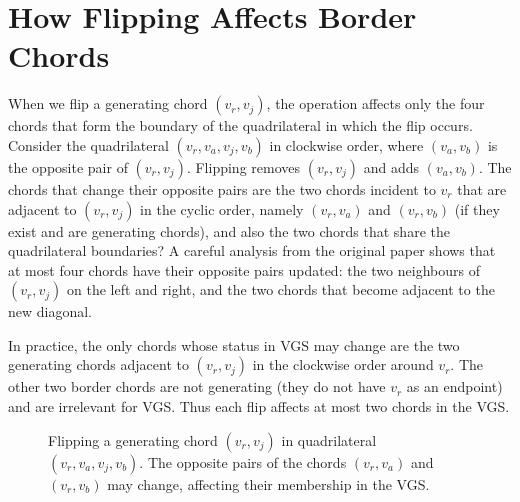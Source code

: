 \section{How Flipping Affects Border Chords}
\label{sec:vgs_flip_effect}

When we flip a generating chord \((v_r, v_j)\), the operation affects only the four chords that form the boundary of the quadrilateral in which the flip occurs. 
Consider the quadrilateral \((v_r, v_a, v_j, v_b)\) in clockwise order, where \((v_a, v_b)\) is the opposite pair of \((v_r, v_j)\). 
Flipping removes \((v_r, v_j)\) and adds \((v_a, v_b)\). 
The chords that change their opposite pairs are the two chords incident to \(v_r\) that are adjacent to \((v_r, v_j)\) in the cyclic order, namely \((v_r, v_a)\) and \((v_r, v_b)\) (if they exist and are generating chords), and also the two chords that share the quadrilateral boundaries? 
A careful analysis from the original paper shows that at most four chords have their opposite pairs updated: the two neighbours of \((v_r, v_j)\) on the left and right, and the two chords that become adjacent to the new diagonal.

In practice, the only chords whose status in VGS may change are the two generating chords adjacent to \((v_r, v_j)\) in the clockwise order around \(v_r\). 
The other two border chords are not generating (they do not have \(v_r\) as an endpoint) and are irrelevant for VGS. 
Thus each flip affects at most two chords in the VGS.

\begin{figure}[htbp]
    \centering
    \caption{Flipping a generating chord \((v_r, v_j)\) in quadrilateral \((v_r, v_a, v_j, v_b)\). 
    The opposite pairs of the chords \((v_r, v_a)\) and \((v_r, v_b)\) may change, affecting their membership in the VGS.}
    \label{fig:flip_affects_border}
\end{figure}

